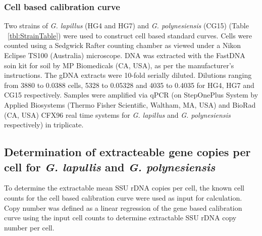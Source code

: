 \documentclass[12pt]{article}
\begin{document}
\subsubsection*{Cell based calibration curve}
Two strains of \emph{G. lapillus} (HG4 and HG7) and \emph{G. polynesiensis} (CG15) (Table ~\ref{tbl:StrainTable}) were used to construct cell based standard curves. Cells were counted using a Sedgwick Rafter counting chamber as viewed under a Nikon Eclipse TS100 (Australia) microscope. DNA was extracted with the FastDNA soin kit for soil by MP Biomedicals (CA, USA), as per the manufacturer's instructions. The gDNA extracts were 10-fold serially diluted. Dilutions ranging from 3880 to 0.0388 cells, 5328 to 0.05328 and 4035 to 0.4035 for HG4, HG7 and CG15 respectively. Samples were amplified via qPCR (on StepOnePlus System by Applied Biosystems (Thermo Fisher Scientific, Waltham, MA, USA) and BioRad (CA, USA) CFX96 real time systems for \emph{G. lapillus} and \emph{G. polynesiensis} respectively) in triplicate.

\subsection*{Determination of extracteable gene copies per cell for \emph{G. lapullis} and \emph{G. polynesiensis}}

To determine the extractable mean SSU rDNA copies per cell, the known cell counts for the cell based calibration curve were used as input for calculation. Copy number was defined as a linear regression of the gene based calibration curve using the input cell counts to determine extractable SSU rDNA copy number per cell.
\end{document}
